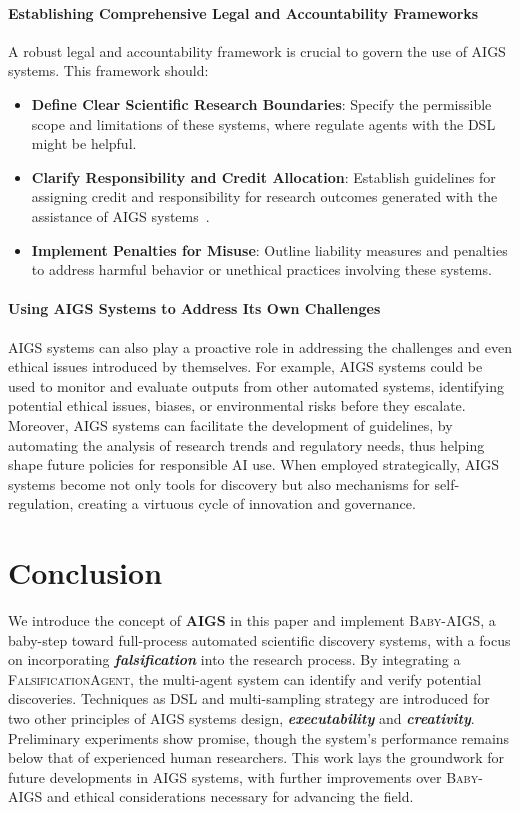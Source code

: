 \documentclass{article} %
\newcommand{\AIGS}{AIGS\xspace}
\newcommand{\AIGSSys}{\textsc{Baby-AIGS}\xspace}
\newcommand{\FalsificationAgent}{\textsc{FalsificationAgent}\xspace}
\newcommand{\DSL}{\textsc{DSL}\xspace}
\begin{document}
\paragraph{Establishing Comprehensive Legal and Accountability Frameworks}
A robust legal and accountability framework is crucial to govern the use of \AIGS systems. This framework should:
\begin{itemize}
    \item \textbf{Define Clear Scientific Research Boundaries}: Specify the permissible scope and limitations of these systems, where regulate agents with the \DSL might be helpful.
    \item \textbf{Clarify Responsibility and Credit Allocation}: Establish guidelines for assigning credit and responsibility for research outcomes generated with the assistance of \AIGS systems~\citep{si2024can, hu2024nova}.
    \item \textbf{Implement Penalties for Misuse}: Outline liability measures and penalties to address harmful behavior or unethical practices involving these systems.
\end{itemize}

\paragraph{Using \AIGS Systems to Address Its Own Challenges}
\AIGS systems can also play a proactive role in addressing the challenges and even ethical issues introduced by themselves. 
For example, \AIGS systems could be used to monitor and evaluate outputs from other automated systems, identifying potential ethical issues, biases, or environmental risks before they escalate.
Moreover, \AIGS systems can facilitate the development of guidelines, by automating the analysis of research trends and regulatory needs, thus helping shape future policies for responsible AI use.
When employed strategically, \AIGS systems become not only tools for discovery but also mechanisms for self-regulation, creating a virtuous cycle of innovation and governance.

\section{Conclusion}

We introduce the concept of \textbf{\AIGS} in this paper and implement \AIGSSys, a baby-step toward full-process automated scientific discovery systems, with a focus on incorporating \textit{\textbf{falsification}} into the research process. By integrating a \FalsificationAgent, the multi-agent system can identify and verify potential discoveries. Techniques as \DSL and multi-sampling strategy are introduced for two other principles of \AIGS systems design, \textit{\textbf{executability}} and \textit{\textbf{creativity}}. Preliminary experiments show promise, though the system's performance remains below that of experienced human researchers. This work lays the groundwork for future developments in \AIGS systems, with further improvements over \AIGSSys and ethical considerations necessary for advancing the field.
\end{document}
